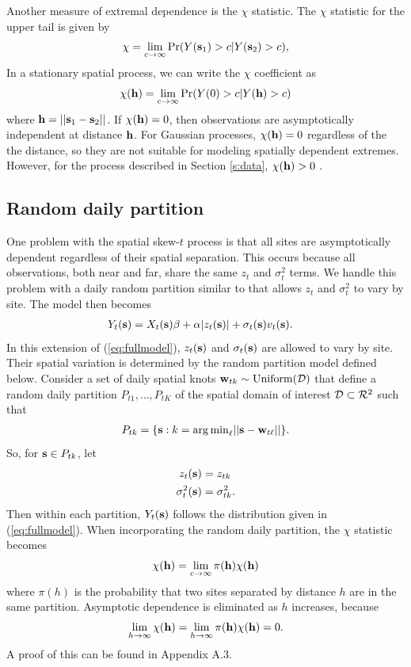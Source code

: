 \documentclass[11pt]{article}
\begin{document}
Another measure of extremal dependence is the $\chi$ statistic.
The $\chi$ statistic for the upper tail is given by
\begin{align*}
  \chi = \lim_{c \rightarrow \infty} \Pr(Y(\mbox{\bf s}_1) > c | Y(\mbox{\bf s}_2) > c),
\end{align*}
In a stationary spatial process, we can write the $\chi$ coefficient as
\begin{align*}
  \chi(\mbox{\bf h}) = \lim_{c \rightarrow \infty} \Pr(Y(0) > c | Y(\mbox{\bf h}) > c)
\end{align*}
where $\mbox{\bf h} = ||\mbox{\bf s}_1 - \mbox{\bf s}_2||$.
If $\chi(\mbox{\bf h}) = 0$, then observations are asymptotically independent at distance $\mbox{\bf h}$.
For Gaussian processes, $\chi(\mbox{\bf h}) = 0$ regardless of the the distance, so they are not suitable for modeling spatially dependent extremes.
However, for the process described in Section \ref{s:data}, $\chi(\mbox{\bf h}) > 0$ \citep{Padoan2011}.

\subsection{Random daily partition}\label{s:part}
One problem with the spatial skew-$t$ process is that all sites are asymptotically dependent regardless of their spatial separation.
This occurs because all observations, both near and far, share the same $z_t$ and $\sigma^2_t$ terms.
We handle this problem with a daily random partition similar to \citet{Kim2005} that allows $z_t$ and $\sigma^2_t$ to vary by site.
The model then becomes
\begin{align}
  Y_t(\mbox{\bf s}) &= X_t(\mbox{\bf s}) \beta + \alpha |z_t(\mbox{\bf s})| + \sigma_t(\mbox{\bf s}) v_t(\mbox{\bf s}).
\end{align}
In this extension of (\ref{eq:fullmodel}), $z_t(\mbox{\bf s})$ and $\sigma_t(\mbox{\bf s})$ are allowed to vary by site.
Their spatial variation is determined by the random partition model defined below.
Consider a set of daily spatial knots $\mbox{\bf w}_{tk} \sim \text{Uniform}({\cal D})$ that define a random daily partition $P_{t1}, \ldots, P_{tK}$ of the spatial domain of interest ${\cal D} \subset {\cal R}^2$ such that
\begin{align*}
  P_{tk} = \{ \mbox{\bf s} : k = {\mathop{\rm arg\, min}}_\ell || \mbox{\bf s} - \mbox{\bf w}_{t\ell} || \}.
\end{align*}
So, for $\mbox{\bf s} \in P_{tk}$, let
\begin{align}
  z_t(\mbox{\bf s}) &= z_{tk} \label{eq:sitez}\\
  \sigma^2_t(\mbox{\bf s}) &= \sigma^2_{tk} \label{eq:sitesig}.
\end{align}
Then within each partition, $Y_t(\mbox{\bf s})$ follows the distribution given in (\ref{eq:fullmodel}).
When incorporating the random daily partition, the $\chi$ statistic becomes
\begin{align}
  \chi(\mbox{\bf h}) = \lim_{c \rightarrow \infty} \pi(\mbox{\bf h}) \chi(\mbox{\bf h})
\end{align}
where $\pi(h)$ is the probability that two sites separated by distance $h$ are in the same partition.
Asymptotic dependence is eliminated as $h$ increases, because
\begin{align}
  \lim_{h \rightarrow \infty} \chi(\mbox{\bf h}) = \lim_{h \rightarrow \infty} \pi(\mbox{\bf h}) \chi(\mbox{\bf h}) = 0.
\end{align}
A proof of this can be found in Appendix A.3.
\end{document}
